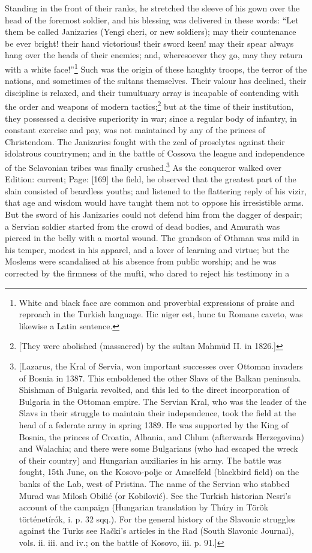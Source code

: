 Standing in the front of their ranks, he stretched the sleeve of his gown over the head of the foremost soldier, and his blessing was delivered in these words: \texthebrew{“}Let them be called Janizaries (Yengi cheri, or new soldiers); may their countenance be ever bright! their hand victorious! their sword keen! may their spear always hang over the heads of their enemies; and, wheresoever they go, may they return with a white face!\texthebrew{}”\footnote{White and black face are common and proverbial expressions of praise and reproach in the Turkish language. Hic niger est, hunc tu Romane caveto, was likewise a Latin sentence.} Such was the origin of these haughty troops, the terror of the nations, and sometimes of the sultans themselves. Their valour has declined, their discipline is relaxed, and their tumultuary array is incapable of contending with the order and weapons of modern tactics;\footnote{[They were abolished (massacred) by the sultan Mahmūd II. in 1826.]} but at the time of their institution, they possessed a decisive superiority in war; since a regular body of infantry, in constant exercise and pay, was not maintained by any of the princes of Christendom. The Janizaries fought with the zeal of proselytes against their idolatrous countrymen; and in the battle of Cossova the league and independence of the Sclavonian tribes was finally crushed.\footnote{[Lazarus, the Kral of Servia, won important successes over Ottoman invaders of Bosnia in 1387. This emboldened the other Slavs of the Balkan peninsula. Shishman of Bulgaria revolted, and this led to the direct incorporation of Bulgaria in the Ottoman empire. The Servian Kral, who was the leader of the Slavs in their struggle to maintain their independence, took the field at the head of a federate army in spring 1389. He was supported by the King of Bosnia, the princes of Croatia, Albania, and Chlum (afterwards Herzegovina) and Walachia; and there were some Bulgarians (who had escaped the wreck of their country) and Hungarian auxiliaries in his army. The battle was fought, 15th June, on the Kosovo-polje or Amselfeld (blackbird field) on the banks of the Lab, west of Pristina. The name of the Servian who stabbed Murad was Milosh Obilić (or Kobilović). See the Turkish historian Nesri\texthebrew{}’s account of the campaign (Hungarian translation by Thúry in Török történetírók, i. p. 32 sqq.). For the general history of the Slavonic struggles against the Turks see Rački\texthebrew{}’s articles in the Rad (South Slavonic Journal), vols. ii. iii. and iv.; on the battle of Kosovo, iii. p. 91.]} As the conqueror walked over Edition: current; Page: [169] the field, he observed that the greatest part of the slain consisted of beardless youths; and listened to the flattering reply of his vizir, that age and wisdom would have taught them not to oppose his irresistible arms. But the sword of his Janizaries could not defend him from the dagger of despair; a Servian soldier started from the crowd of dead bodies, and Amurath was pierced in the belly with a mortal wound. The grandson of Othman was mild in his temper, modest in his apparel, and a lover of learning and virtue; but the Moslems were scandalised at his absence from public worship; and he was corrected by the firmness of the mufti, who dared to reject his testimony in a 